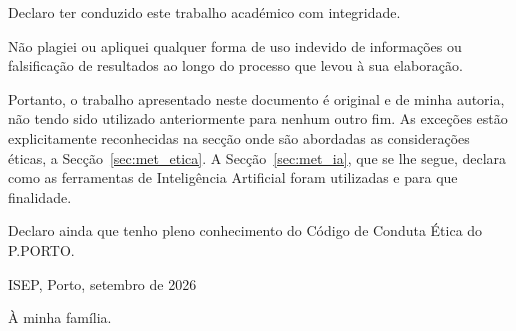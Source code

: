
\frontmatter
\pagestyle{plain}

\maketitlepage


\begin{soi}

\vspace{1cm}

Declaro ter conduzido este trabalho académico com integridade.

Não plagiei ou apliquei qualquer forma de uso indevido de informações ou falsificação de
resultados ao longo do processo que levou à sua elaboração.

Portanto, o trabalho apresentado neste documento é original e de minha autoria, não tendo sido
utilizado anteriormente para nenhum outro fim. As exceções estão explicitamente reconhecidas na
secção onde são abordadas as considerações éticas, a Secção~\ref{sec:met_etica}. A
Secção~\ref{sec:met_ia}, que se lhe segue, declara como as ferramentas de Inteligência Artificial
foram utilizadas e para que finalidade.

Declaro ainda que tenho pleno conhecimento do Código de Conduta Ética do P.PORTO.

\vspace{1cm}

ISEP, Porto, setembro de 2026

\end{soi}

\begin{dedicatory}
À minha família.
\end{dedicatory}

